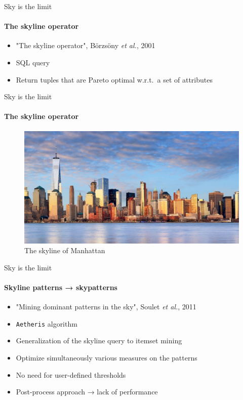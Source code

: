 \documentclass{beamer}
\newcommand{\etal}{\emph{et al.}}
\newcommand{\aeth}{\texttt{Aetheris}}
\begin{document}
\begin{frame}{Sky is the limit}
  \framesubtitle{The skyline operator}
  \begin{itemize}
  \item "The skyline operator", Börzsöny \etal{}, 2001
  \item SQL query
  \item Return tuples that are Pareto optimal w.r.t.\ a set of attributes
  \end{itemize}
\end{frame}

\begin{frame}{Sky is the limit}
  \framesubtitle{The skyline operator}
  \begin{figure}[htp]
  \centering
  \includegraphics[width=\textwidth]{manhattan.jpg}
  \caption{The skyline of Manhattan}
  \end{figure} 
\end{frame}

\begin{frame}{Sky is the limit}
  \framesubtitle{Skyline patterns → skypatterns}
  \begin{itemize}
  \item "Mining dominant patterns in the sky", Soulet \etal{}, 2011
  \item \aeth{} algorithm
  \item Generalization of the skyline query to itemset mining
  \pause
  \item Optimize simultaneously various measures on the patterns
  \item No need for user-defined thresholds
  \pause
  \item Post-process approach → lack of performance
  \end{itemize}
\end{frame}

\end{document}
